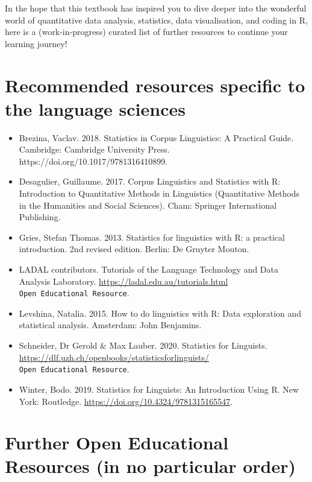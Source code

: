 \documentclass[
  letterpaper,
  DIV=11,
  numbers=noendperiod]{scrreprt}
\begin{document}
In the hope that this textbook has inspired you to dive deeper into the
wonderful world of quantitative data analysis, statistics, data
visualisation, and coding in R, here is a (work-in-progress) curated
list of further resources to continue your learning journey! 🚀✨

\section{Recommended resources specific to the language
sciences}\label{recommended-resources-specific-to-the-language-sciences}

\begin{itemize}
\item
  Brezina, Vaclav. 2018. Statistics in Corpus Linguistics: A Practical
  Guide. Cambridge: Cambridge University Press.
  https://doi.org/10.1017/9781316410899.
\item
  Desagulier, Guillaume. 2017. Corpus Linguistics and Statistics with R:
  Introduction to Quantitative Methods in Linguistics (Quantitative
  Methods in the Humanities and Social Sciences). Cham: Springer
  International Publishing.
\item
  Gries, Stefan Thomas. 2013. Statistics for linguistics with R: a
  practical introduction. 2nd revised edition. Berlin: De Gruyter
  Mouton.
\item
  LADAL contributors. Tutorials of the Language Technology and Data
  Analysis Laboratory. \url{https://ladal.edu.au/tutorials.html}
  \texttt{Open\ Educational\ Resource}.
\item
  Levshina, Natalia. 2015. How to do linguistics with R: Data
  exploration and statistical analysis. Amsterdam: John Benjamins.
\item
  Schneider, Dr Gerold \& Max Lauber. 2020. Statistics for Linguists.
  \url{https://dlf.uzh.ch/openbooks/statisticsforlinguists/}
  \texttt{Open\ Educational\ Resource}.
\item
  Winter, Bodo. 2019. Statistics for Linguists: An Introduction Using R.
  New York: Routledge.
  \href{https://doi.org/10.1017/9781316410899}{https://doi.org/10.4324/9781315165547}.
\end{itemize}

\section{Further Open Educational Resources (in no particular
order)}\label{further-open-educational-resources-in-no-particular-order}
\end{document}
